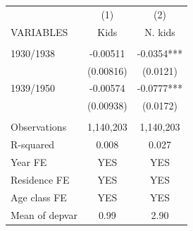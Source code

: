 \begin{tabular}{lcc} \hline
 & (1) & (2) \\
VARIABLES & Kids & N. kids \\ \hline
 &  &  \\
1930/1938 & -0.00511 & -0.0354*** \\
 & (0.00816) & (0.0121) \\
1939/1950 & -0.00574 & -0.0777*** \\
 & (0.00938) & (0.0172) \\
 &  &  \\
Observations & 1,140,203 & 1,140,203 \\
R-squared & 0.008 & 0.027 \\
Year FE & YES & YES \\
Residence FE & YES & YES \\
Age class FE & YES & YES \\
 Mean of depvar & 0.99 & 2.90 \\ \hline
\end{tabular}
